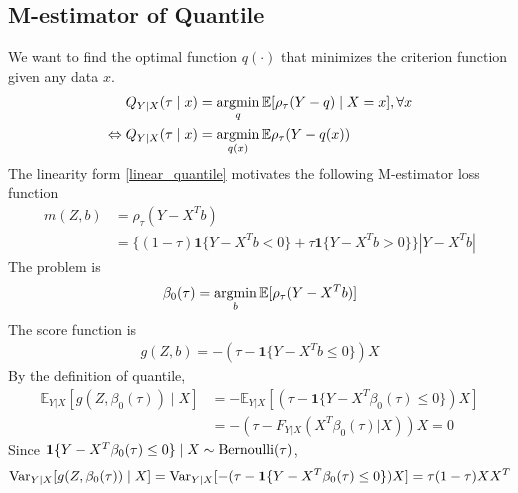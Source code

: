 \documentclass[11pt]{elegantbook}
\newcommand{\argmin}{\operatornamewithlimits{argmin}}
\begin{document}
\subsection{M-estimator of Quantile}
We want to find the optimal function $q(\cdot)$ that minimizes the criterion function given any data $x$.
\begin{equation}
    \begin{aligned}
        Q_{Y|X}(\tau\mid x)&=\argmin_{q} \mathbb{E}[\rho_\tau(Y-q)\mid X=x],\forall x\\
        \Leftrightarrow Q_{Y|X}(\tau\mid x)&=\argmin_{q(x)} \mathbb{E}\rho_\tau(Y-q(x))
    \end{aligned}
    \nonumber
\end{equation}
The linearity form \eqref{linear_quantile} motivates the following M-estimator loss function
\begin{equation}
    \begin{aligned}
        m(Z,b)&=\rho_\tau(Y-X^Tb)\\
        &=\{(1-\tau)\mathbf{1}\{Y-X^Tb<0\}+\tau\mathbf{1}\{Y-X^Tb>0\}\}|Y-X^Tb|
    \end{aligned}
    \nonumber
\end{equation}
The problem is
\begin{equation}
    \begin{aligned}
        \beta_0(\tau)=\argmin_b \mathbb{E}[\rho_\tau(Y-X^Tb)]
    \end{aligned}
    \nonumber
\end{equation}
The score function is
\begin{equation}
    \begin{aligned}
        g(Z,b)=-(\tau-\mathbf{1}\{Y-X^Tb\leq 0\})X
    \end{aligned}
    \nonumber
\end{equation}
By the definition of quantile,
\begin{equation}
    \begin{aligned}
        \mathbb{E}_{Y|X}[g(Z,\beta_0(\tau))\mid X]&=-\mathbb{E}_{Y|X}[(\tau-\mathbf{1}\{Y-X^T\beta_0(\tau)\leq 0\})X]\\
        &=-(\tau-F_{Y|X}(X^T\beta_0(\tau)|X))X=0
    \end{aligned}
    \nonumber
\end{equation}
Since $\mathbf{1}\{Y-X^T\beta_0(\tau)\leq 0\}\mid X\sim \textnormal{Bernoulli}(\tau)$,
\begin{equation}
    \begin{aligned}
        \textnormal{Var}_{Y|X}[g(Z,\beta_0(\tau))\mid X]=\textnormal{Var}_{Y|X}[-(\tau-\mathbf{1}\{Y-X^T\beta_0(\tau)\leq 0\})X]=\tau(1-\tau)XX^T
    \end{aligned}
    \nonumber
\end{equation}
\end{document}
